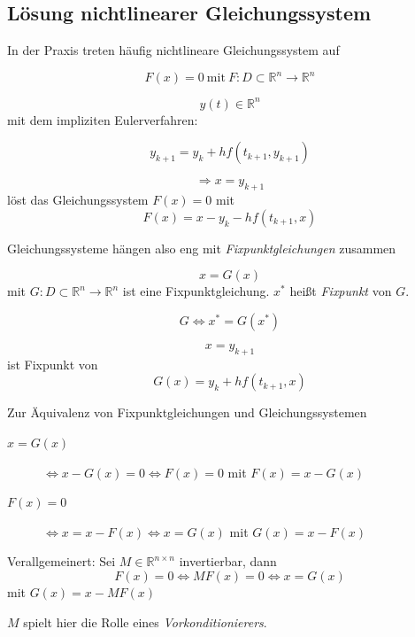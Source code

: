 \documentclass[10pt,a4paper]{article}
\begin{document}
\subsection{Lösung nichtlinearer Gleichungssystem}

In der Praxis treten häufig nichtlineare Gleichungssystem auf

$$F(x)=0 ~ \text{mit}  ~  F: D \subset \mathbb{R}^{n} \rightarrow \mathbb{R}^{n}$$


\begin{bsp}[$y'=f(t,y)$]

$$y(t) \in \mathbb{R}^{n}$$ mit dem impliziten Eulerverfahren:

$$y_{k+1}=y_k + h f(t_{k+1},y_{k+1})$$

$$\Rightarrow x = y_{k+1}$$ löst das Gleichungssystem $F(x)=0$ mit
$$F(x)=x-y_k-h f(t_{k+1},x)$$
\end{bsp}


Gleichungssysteme hängen also eng mit \emph{Fixpunktgleichungen} zusammen

\begin{defi}[Fixpunktgleichung]
$$x=G(x)$$ mit $G: D\subset \mathbb{R}^{n} \rightarrow \mathbb{R}^{n} $ ist eine Fixpunktgleichung. $x^{*}$ heißt \emph{Fixpunkt} von $G$.

$$G \Leftrightarrow x^{*}=G(x^{*})$$
\end{defi}


\begin{bsp}

$$x=y_{k+1}$$ ist Fixpunkt von $$G(x)=y_k+hf(t_{k+1},x)$$
\end{bsp}

Zur Äquivalenz von Fixpunktgleichungen und Gleichungssystemen

\begin{description}
\item[$x=G(x)$] $\Leftrightarrow x-G(x)=0 \Leftrightarrow F(x)=0$ mit $F(x)=x-G(x)$
\item[$F(x)=0$] $\Leftrightarrow x=x-F(x) \Leftrightarrow x=G(x)$ mit $G(x)=x-F(x)$
\end{description}

Verallgemeinert:
Sei $M \in \mathbb{R}^{n \times n}$ invertierbar, dann
$$F(x)=0 \Leftrightarrow MF(x)=0 \Leftrightarrow x=G(x)$$ mit $G(x)=x-MF(x)$

$M$ spielt hier die Rolle eines \emph{Vorkonditionierers}.
\end{document}

